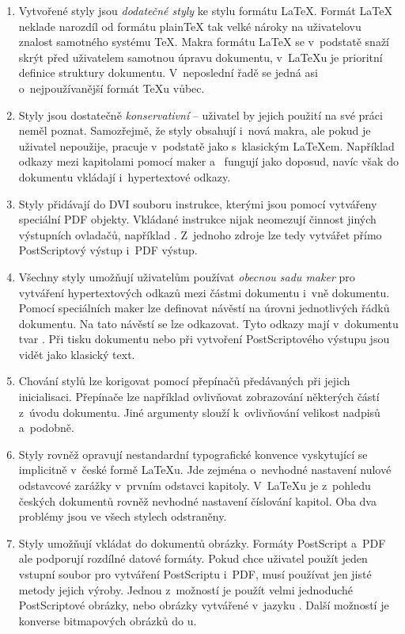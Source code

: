 \documentclass[12pt]{article}
\begin{document}
\begin{enumerate}
\item
  Vytvořené styly jsou \emph{dodatečné styly}
  ke stylu  formátu \LaTeX.
  Formát \LaTeX{} neklade narozdíl od formátu plain\TeX{} 
  tak velké nároky na uživatelovu znalost samotného systému \TeX.
  Makra formátu \LaTeX{} se v~podstatě snaží skrýt před uživatelem samotnou
  úpravu dokumentu, v~\LaTeX u je prioritní definice struktury dokumentu. 
  V~neposlední řadě se jedná asi o~nejpoužívanější formát \TeX u vůbec.
\item
  Styly jsou dostatečně \emph{konservativní} -- uživatel by jejich
  použití na své práci neměl poznat. Samozřejmě, že styly obsahují i~nová
  makra, ale pokud je uživatel nepoužije, pracuje v~podstatě jako 
  s~klasickým \LaTeX em. Například odkazy mezi kapitolami pomocí maker
   a~ fungují jako doposud, navíc však
  do dokumentu vkládají i~hypertextové odkazy.
\item
  Styly přidávají do DVI souboru instrukce, kterými jsou pomocí 
  vytvářeny speciální PDF objekty. Vkládané instrukce nijak neomezují
  činnost jiných výstupních ovladačů, například . Z~jednoho zdroje
  lze tedy vytvářet přímo PostScriptový výstup i~PDF výstup.
\item
  Všechny styly umožňují uživatelům používat \emph{obecnou sadu maker}
  pro vytváření hypertextových odkazů mezi částmi dokumentu i~vně dokumentu. 
  Pomocí speciálních maker lze definovat návěstí na úrovni jednotlivých řádků
  dokumentu. Na tato návěstí se lze odkazovat. 
   Tyto odkazy mají v~dokumentu tvar
  .
  Při tisku dokumentu nebo při vytvoření
  PostScriptového výstupu jsou vidět jako klasický text.
\item
  Chování stylů lze korigovat pomocí přepínačů
  předávaných při jejich inicialisaci. 
  Přepínače lze například ovlivňovat zobrazování některých
  částí z~úvodu dokumentu. Jiné argumenty slouží k~ovlivňování velikost 
  nadpisů a~podobně.
\item
  Styly rovněž opravují nestandardní typografické konvence vyskytující se
  implicitně v~české formě \LaTeX u. Jde zejména o~nevhodné nastavení nulové
  odstavcové zarážky v~prvním odstavci kapitoly. V~\LaTeX u je z~pohledu
  českých dokumentů rovněž nevhodné nastavení číslování kapitol. Oba dva
  problémy jsou ve všech stylech odstraněny.
\item
  Styly umožňují vkládat do dokumentů obrázky. Formáty PostScript a~PDF
  ale podporují rozdílné datové formáty. Pokud chce uživatel použít jeden
  vstupní soubor pro vytváření PostScriptu i~PDF, musí používat jen jisté
  metody jejich výroby. Jednou z~možností je použít 
  velmi jednoduché \mbox{PostScript}ové obrázky, nebo obrázky vytvářené 
  v~jazyku \mbox{\MP}.
  Další možností je konverse bitmapových obrázků do
  \mbox{\MF u}.
\end{enumerate}
\end{document}
